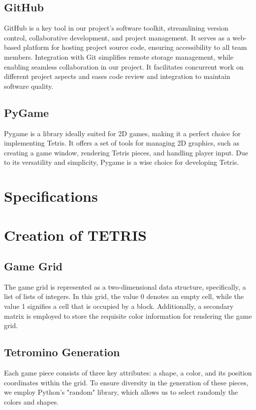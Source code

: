 \documentclass[conference]{IEEEtran}
\begin{document}
\subsection*{GitHub}
GitHub is a key tool in our project's software toolkit, streamlining version control, collaborative development, and project management. It serves as a web-based platform for hosting project source code, ensuring accessibility to all team members. Integration with Git simplifies remote storage management, while enabling seamless collaboration in our project. It facilitates concurrent work on different project aspects and eases code review and integration to maintain software quality.
\subsection*{PyGame}
Pygame\cite{b4} is a library ideally suited for 2D games, making it a perfect choice for implementing Tetris. It offers a set of tools for managing 2D graphics, such as creating a game window, rendering Tetris pieces, and handling player input. Due to its versatility and simplicity, Pygame is a wise choice for developing Tetris.


\section{Specifications}

\section*{Creation of TETRIS}
\subsection{Game Grid}
The game grid is represented as a two-dimensional data structure, specifically, a list of lists of integers. In this grid, the value 0 denotes an empty cell, while the value 1 signifies a cell that is occupied by a block. Additionally, a secondary matrix is employed to store the requisite color information for rendering the game grid.
\subsection{Tetromino Generation}
Each game piece consists of three key attributes: a shape, a color, and its position coordinates within the grid. To ensure diversity in the generation of these pieces, we employ Python's "random"\cite{b5} library, which allows us to select randomly the colors and shapes.
\end{document}
